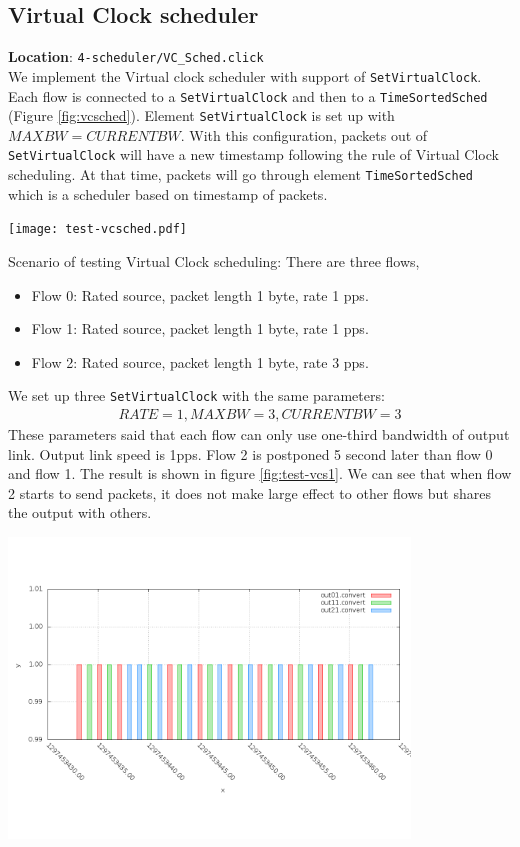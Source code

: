\documentclass[a4paper]{article}
\begin{document}
  \subsection{Virtual Clock scheduler}
  \textbf{Location}: \texttt{4-scheduler/VC\_Sched.click}\\
  We implement the Virtual clock scheduler with support of \texttt{SetVirtualClock}. Each flow is connected to a \texttt{SetVirtualClock} and then to a \texttt{TimeSortedSched} (Figure \ref{fig:vcsched}). Element \texttt{SetVirtualClock} is set up with $MAXBW = CURRENTBW$. With this configuration, packets out of \texttt{SetVirtualClock} will have a new timestamp following the rule of Virtual Clock scheduling. At that time, packets will go through element \texttt{TimeSortedSched} which is a scheduler based on timestamp of packets.

  \begin{center}
	\texttt{[image: test-vcsched.pdf]}
	\label{fig:vcsched}
  \end{center}
  Scenario of testing Virtual Clock scheduling: There are three flows,
  \begin{itemize}
  	\item Flow 0: Rated source, packet length 1 byte, rate 1 pps.
  	\item Flow 1: Rated source, packet length 1 byte, rate 1 pps.
  	\item Flow 2: Rated source, packet length 1 byte, rate 3 pps.
  \end{itemize}
  We set up three \texttt{SetVirtualClock} with the same parameters: 
  \begin{align*}RATE = 1, MAXBW = 3, CURRENTBW = 3\end{align*} 
  These parameters said that each flow can only use one-third bandwidth of output link. Output link speed is 1pps. Flow 2 is postponed 5 second later than flow 0 and flow 1. The result is shown in figure \ref{fig:test-vcs1}. We can see that when flow 2 starts to send packets, it does not make large effect to other flows but shares the output with others.
  
  \begin{center}
	\includegraphics[width=0.80\textwidth]{vcs1-dense.png}
	\label{fig:test-vcs1}
  \end{center}
  
\end{document}
